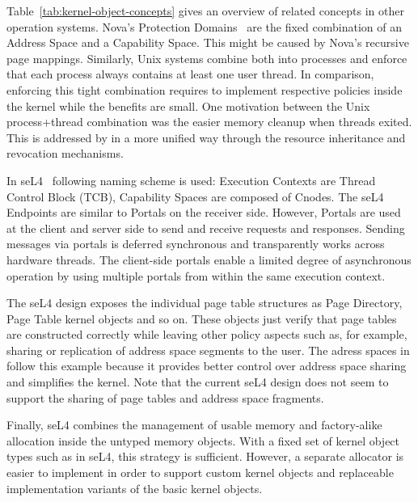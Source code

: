 Table~\ref{tab:kernel-object-concepts} gives an overview of related concepts in other operation systems. Nova's Protection Domains~\cite{Steinberg:2010:NMS:1755913.1755935} are the fixed combination of an Address Space and a Capability Space. This might be caused by Nova's recursive page mappings. Similarly, Unix systems combine both into processes and enforce that each process always contains at least one user thread. In comparison, enforcing this tight combination requires to implement respective policies inside the kernel while the benefits are small. One motivation between the Unix process+thread combination was the easier memory cleanup when threads exited. This is addressed by \mythos in a more unified way through the resource inheritance and revocation mechanisms.  

In seL4~\cite{Heiser:2016:LML:2912578.2893177} following naming scheme is used: Execution Contexts are Thread Control Block (TCB), Capability Spaces are composed of Cnodes. The seL4 Endpoints are similar to \mythos Portals on the receiver side. 
However, \mythos Portals are used at the client and server side to send and receive requests and responses. Sending messages via portals is deferred synchronous and transparently works across hardware threads. The client-side portals enable a limited degree of asynchronous operation by using multiple portals from within the same execution context.

The seL4 design exposes the individual page table structures as Page Directory, Page Table kernel objects and so on. These objects just verify that page tables are constructed correctly while leaving other policy aspects such as, for example, sharing or replication of address space segments to the user. The adress spaces in \mythos follow this example because it provides better control over address space sharing and simplifies the kernel. Note that the current seL4 design does not seem to support the sharing of page tables and address space fragments.

Finally, seL4 combines the management of usable memory and factory-alike allocation inside the untyped memory objects. With a fixed set of kernel object types such as in seL4, this strategy is sufficient. However, a separate allocator is easier to implement in order to support custom kernel objects and replaceable implementation variants of the basic kernel objects.

